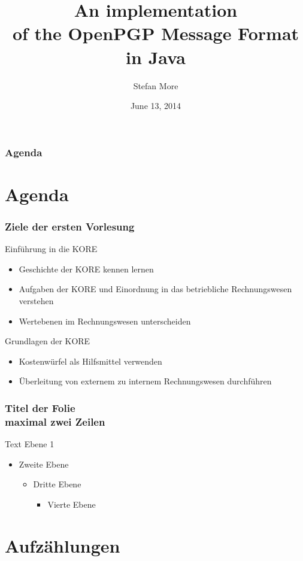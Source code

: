 \documentclass{beamer}
\title[openPGP in Java]{An implementation\\ of the OpenPGP Message Format\\ in Java}
\author{Stefan More}
\date{June 13, 2014}
\institute[Bakk@IAIK]{\\Advisor: Dieter Bratko}
\begin{document}
\titleframe

\begin{frame}
  \frametitle{Agenda}
  \tableofcontents%
\end{frame}


\section{Agenda}
\begin{frame}
	\frametitle{Ziele der ersten Vorlesung}
	Einführung in die KORE
	\begin{itemize}
		\item Geschichte der KORE kennen lernen
		\item Aufgaben der KORE und Einordnung in das betriebliche Rechnungswesen verstehen
		\item Wertebenen im Rechnungswesen unterscheiden
	\end{itemize}
	
	Grundlagen der KORE
	\begin{itemize}
		\item Kostenwürfel als Hilfsmittel verwenden
		\item Überleitung von externem zu internem Rechnungswesen durchführen
	\end{itemize}
\end{frame}

\begin{frame}
	\frametitle{Titel der Folie\\maximal zwei Zeilen}
	Text Ebene 1
	\begin{itemize}
		\item Zweite Ebene
		\begin{itemize}
			\item Dritte Ebene
			\begin{itemize}
				\item Vierte Ebene
			\end{itemize}
		\end{itemize}
	\end{itemize}
\end{frame}

\section{Aufzählungen}
\end{document}
